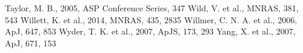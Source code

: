 \documentclass{mn2e}
\begin{document}
\begin{thebibliography}{}
 Taylor, M. B., 2005, ASP Conference Series, 347
 Wild, V. et al., MNRAS, 381, 543
 Willett, K. et al., 2014, MNRAS, 435, 2835
 Willmer, C. N. A. et al., 2006, ApJ, 647, 853
 Wyder, T. K. et al., 2007, ApJS, 173, 293
 Yang, X. et al., 2007, ApJ, 671, 153
\end{thebibliography}{}
\end{document}
